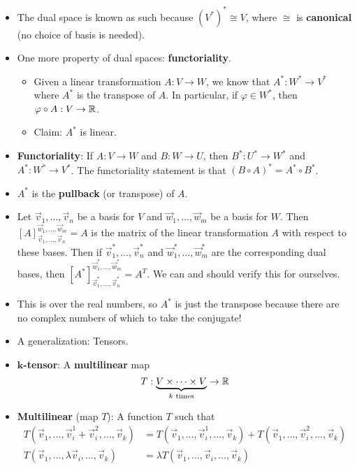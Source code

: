 \documentclass[../notes.tex]{subfiles}
\begin{document}
\begin{itemize}
    \item The dual space is known as such because $(V^*)^*\cong V$, where $\cong$ is \textbf{canonical} (no choice of basis is needed).
    \item One more property of dual spaces: \textbf{functoriality}.
    \begin{itemize}
        \item Given a linear transformation $A:V\to W$, we know that $A^*:W^*\to V^*$ where $A^*$ is the transpose of $A$. In particular, if $\varphi\in W^*$, then $\varphi\circ A:V\to\mathbb{R}$.
        \item Claim: $A^*$ is linear.
    \end{itemize}
    \item \textbf{Functoriality}: If $A:V\to W$ and $B:W\to U$, then $B^*:U^*\to W^*$ and $A^*:W^*\to V^*$. The functoriality statement is that $(B\circ A)^*=A^*\circ B^*$.
    \item $A^*$ is the \textbf{pullback} (or transpose) of $A$.
    \item Let $\vec{v}_1,\dots,\vec{v}_n$ be a basis for $V$ and $\vec{w}_1,\dots,\vec{w}_m$ be a basis for $W$. Then $[A]_{\vec{v}_1,\dots,\vec{v}_n}^{\vec{w}_1,\dots,\vec{w}_m}=A$ is the matrix of the linear transformation $A$ with respect to these bases. Then if $\vec{v}_1^*,\dots,\vec{v}_n^*$ and $\vec{w}_1^*,\dots,\vec{w}_m^*$ are the corresponding dual bases, then $[A^*]_{\vec{v}_1^*,\dots,\vec{v}_n^*}^{\vec{w}_1^*,\dots,\vec{w}_m^*}=A^T$. We can and should verify this for ourselves.
    \item This is over the real numbers, so $A^*$ is just the transpose because there are no complex numbers of which to take the conjugate!
    \item A generalization: Tensors.
    \item \textbf{$\bm{k}$-tensor}: A \textbf{multilinear} map
    \begin{equation*}
        T:\underbrace{V\times\cdots\times V}_{k\text{ times}}\to\mathbb{R}
    \end{equation*}
    \item \textbf{Multilinear} (map $T$): A function $T$ such that
    \begin{align*}
        T(\vec{v}_1,\dots,\vec{v}_i^1+\vec{v}_i^2,\dots,\vec{v}_k) &= T(\vec{v}_1,\dots,\vec{v}_i^1,\dots,\vec{v}_k)+T(\vec{v}_1,\dots,\vec{v}_i^2,\dots,\vec{v}_k)\\
        T(\vec{v}_1,\dots,\lambda \vec{v}_i,\dots,\vec{v}_k) &= \lambda T(\vec{v}_1,\dots,\vec{v}_i,\dots,\vec{v}_k)

\end{align*}
\end{itemize}
\end{document}
